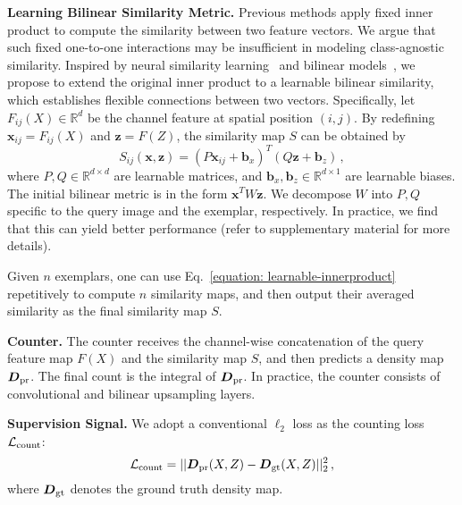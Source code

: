 \documentclass[10pt,twocolumn,letterpaper]{article}
\newcommand{\margin}{\vspace{3pt}\noindent}
\begin{document}
\margin
\textbf{Learning Bilinear Similarity Metric.}
Previous methods apply fixed inner product to compute the similarity between two feature vectors. We argue that such fixed one-to-one interactions may be insufficient in modeling class-agnostic similarity. Inspired by neural similarity learning~\cite{neural_similarity_learning} and bilinear models~\cite{low_rank_bp}, we propose to extend the original inner product to a learnable bilinear similarity, which establishes flexible connections between two vectors. Specifically, let $F_{ij}(X)\in\mathbb{R}^d$ be the channel feature at spatial position $(i,j)$. By redefining $\boldsymbol{x}_{ij}=F_{ij}(X)$ and $\boldsymbol{z}=F(Z)$, the similarity map $S$ can be obtained by
\begin{equation}
\label{equation: learnable-innerproduct}
S_{ij}\left(\boldsymbol{x,z}\right) = \left( P\boldsymbol{x}_{ij} + \boldsymbol{b}_x \right) ^T\left( Q\boldsymbol{z} + \boldsymbol{b}_z \right)\,, \end{equation}
where $P,Q \in \mathbb{R}^{d\times d}$ are learnable matrices, and $\boldsymbol{b}_x,\boldsymbol{b}_z \in \mathbb{R}^{d\times 1}$ are learnable biases. The initial bilinear metric is in the form $\boldsymbol{x}^{T}W\boldsymbol{z}$. We decompose $W$ into $P,Q$ specific to the query image and the exemplar, respectively. In practice, we find that this can yield better performance (refer to supplementary material for more details). 

Given $n$ exemplars, one can use Eq.~\ref{equation: learnable-innerproduct} repetitively to compute $n$ similarity maps, and then output their averaged similarity as the final similarity map $S$.

\margin
\textbf{Counter.}
The counter receives the channel-wise concatenation of the query feature map $F(X)$ and the similarity map $S$, and then predicts a density map $\boldsymbol{D}_{\rm pr}$. The final count is the integral of $\boldsymbol{D}_{\rm pr}$. In practice, the counter consists of convolutional and bilinear upsampling layers.

\margin
\textbf{Supervision Signal.}
We adopt a conventional $\ell_2$ loss as the counting loss $\mathcal{L}_{\rm count}$:
\begin{equation}
\mathcal{L}_{\rm count} = ||\boldsymbol{D}_{\rm pr}(X,Z)-\boldsymbol{D}_{\rm gt}(X,Z)||_2^2\,,
\end{equation}
where $\boldsymbol{D}_{\rm gt}$ denotes the ground truth density map. 
\end{document}
